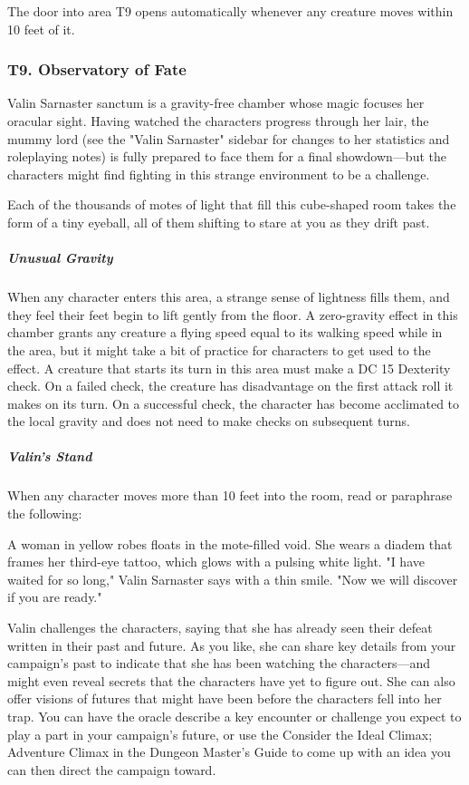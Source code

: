 \documentclass[10pt,a4paper,twoside,bg=print,twocolumn,openany,nodeprecatedcode]{dndbook}
\begin{document}
The door into area T9 opens automatically whenever any creature moves within 10 feet of it.

\subsubsection{T9. Observatory of Fate}
Valin Sarnaster sanctum is a gravity-free chamber whose magic focuses her oracular sight. Having watched the characters progress through her lair, the mummy lord (see the "Valin Sarnaster" sidebar for changes to her statistics and roleplaying notes) is fully prepared to face them for a final showdown—but the characters might find fighting in this strange environment to be a challenge.

\begin{DndReadAloud}{}
Each of the thousands of motes of light that fill this cube-shaped room takes the form of a tiny eyeball, all of them shifting to stare at you as they drift past.

\end{DndReadAloud}

\subparagraph{Unusual Gravity}
When any character enters this area, a strange sense of lightness fills them, and they feel their feet begin to lift gently from the floor. A zero-gravity effect in this chamber grants any creature a flying speed equal to its walking speed while in the area, but it might take a bit of practice for characters to get used to the effect. A creature that starts its turn in this area must make a DC 15 Dexterity check. On a failed check, the creature has disadvantage on the first attack roll it makes on its turn. On a successful check, the character has become acclimated to the local gravity and does not need to make checks on subsequent turns.

\subparagraph{Valin's Stand}
When any character moves more than 10 feet into the room, read or paraphrase the following:

\begin{DndReadAloud}{}
A woman in yellow robes floats in the mote-filled void. She wears a diadem that frames her third-eye tattoo, which glows with a pulsing white light. "I have waited for so long," Valin Sarnaster says with a thin smile. "Now we will discover if you are ready."

\end{DndReadAloud}

Valin challenges the characters, saying that she has already seen their defeat written in their past and future. As you like, she can share key details from your campaign's past to indicate that she has been watching the characters—and might even reveal secrets that the characters have yet to figure out. She can also offer visions of futures that might have been before the characters fell into her trap. You can have the oracle describe a key encounter or challenge you expect to play a part in your campaign's future, or use the Consider the Ideal Climax; Adventure Climax in the Dungeon Master's Guide to come up with an idea you can then direct the campaign toward.
\end{document}
